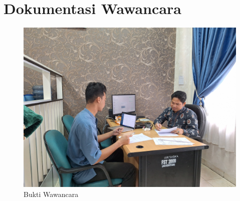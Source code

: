 %
%
%
%


\renewcommand{\thepage}{C - \arabic{page}}
\chapter{Dokumentasi Wawancara}
\begin{figure}[h]
	\centering
	\includegraphics[width=0.82\linewidth]{konten/gambar/wawancara.jpg}
	\caption{Bukti Wawancara}
	\label{fig:hasil-wawancara}
\end{figure}